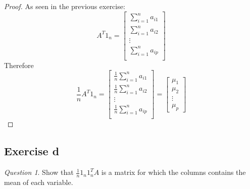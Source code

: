 \documentclass[11pt]{article}
\theoremstyle{definition}
\theoremstyle{remark}
\theoremstyle{remark}
\theoremstyle{remark}
\newtheorem*{question}{Question}
\theoremstyle{proof}
\begin{document}
\begin{proof}
  As seen in the previous exercise:
  \begin{equation*}
    A^{T}1_{n} =
    \begin{bmatrix}
      \displaystyle\sum_{i=1}^{n}a_{i1} \\
      \displaystyle\sum_{i=1}^{n}a_{i2} \\
      \vdots \\
      \displaystyle\sum_{i=1}^{n}a_{ip} \\
    \end{bmatrix}
  \end{equation*}
  Therefore
  \begin{equation*}
    \frac{1}{n}A^{T}1_{n} =
    \begin{bmatrix}
      \displaystyle\frac{1}{n}\sum_{i=1}^{n}a_{i1} \\
      \displaystyle\frac{1}{n}\sum_{i=1}^{n}a_{i2} \\
      \vdots \\
      \displaystyle\frac{1}{n}\sum_{i=1}^{n}a_{ip} \\
    \end{bmatrix}
    =
    \begin{bmatrix}
      \mu_{1} \\
      \mu_{2} \\
      \vdots \\
      \mu_{p}
    \end{bmatrix}
  \end{equation*}
\end{proof}
\subsection*{Exercise d}
\begin{question}
  Show that $\frac{1}{n}1_{n}1_{n}^{T}A$ is a matrix for which the columns
  contains the mean of each variable.
\end{question}
\end{document}

